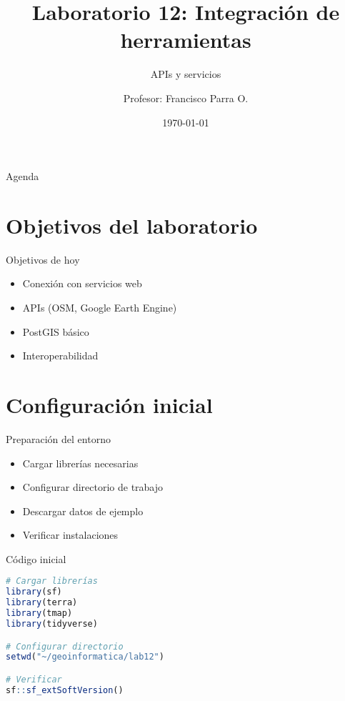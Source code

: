 \documentclass[10pt]{beamer}
\title{Laboratorio 12: Integración de herramientas}
\subtitle{APIs y servicios}
\author{Profesor: Francisco Parra O.}
\institute{USACH - Ingeniería Civil en Informática}
\date{\today}
\begin{document}
\maketitle

\begin{frame}{Agenda}
    \tableofcontents
\end{frame}


\section{Objetivos del laboratorio}

\begin{frame}{Objetivos de hoy}
    \begin{itemize}
        \item Conexión con servicios web
        \item APIs (OSM, Google Earth Engine)
        \item PostGIS básico
        \item Interoperabilidad
    \end{itemize}
\end{frame}

\section{Configuración inicial}

\begin{frame}{Preparación del entorno}
    \begin{itemize}
        \item Cargar librerías necesarias
        \item Configurar directorio de trabajo
        \item Descargar datos de ejemplo
        \item Verificar instalaciones
    \end{itemize}
\end{frame}

\begin{frame}[fragile]{Código inicial}
    \begin{lstlisting}[language=R]
# Cargar librerías
library(sf)
library(terra)
library(tmap)
library(tidyverse)

# Configurar directorio
setwd("~/geoinformatica/lab12")

# Verificar
sf::sf_extSoftVersion()
    \end{lstlisting}
\end{frame}
\end{document}
